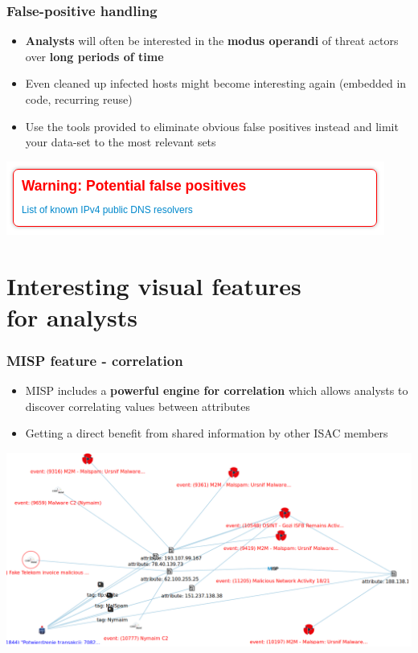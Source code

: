 \begin{frame}
	\frametitle{False-positive handling}
	\begin{itemize}
		\item \textbf{Analysts} will often be interested in the \textbf{modus operandi} of threat actors over \textbf{long periods of time}
		\item Even cleaned up infected hosts might become interesting again (embedded in code, recurring reuse)
		\item Use the tools provided to eliminate obvious false positives instead and limit your data-set to the most relevant sets
	\end{itemize}
	\centering\includegraphics[scale=0.8]{../images/false-positive.png}
\end{frame}

\section{Interesting visual features \\ for analysts}

\begin{frame}
    \frametitle{MISP feature - correlation}
    \begin{itemize}
        \item MISP includes a \textbf{powerful engine for correlation} which allows analysts to discover correlating values between attributes
        \item Getting a direct benefit from shared information by other ISAC members
    \end{itemize}
    \includegraphics[scale=0.20]{../images/correlation.png}
\end{frame}

